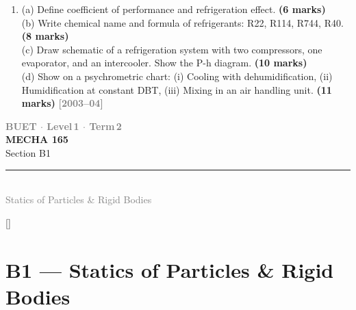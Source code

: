 \documentclass[12pt,a3paper]{article}
\newcommand{\yr}[1]{\hfill\textcolor{gray}{\small\textbf{[#1]}}}
\newcommand{\mk}[1]{\textcolor{orange!70!black}{\small\textbf{(#1 marks)}}}
\newcommand{\secdivider}[4]{%
  \newpage\thispagestyle{empty}%
  \vspace*{\fill}%
  \begin{tcolorbox}[enhanced,colback=#4!7,colframe=#3,boxrule=1.5pt,arc=8pt,
    left=20pt,right=20pt,top=22pt,bottom=22pt,
    shadow={3pt}{-3pt}{0pt}{black!15}]
    \centering
    {\large\textcolor{gray}{\textbf{BUET $\cdot$ Level\,1 $\cdot$ Term\,2}}}\\[8pt]
    {\fontsize{26}{32}\selectfont\bfseries\textcolor{#3}{MECHA 165}}\\[6pt]
    {\fontsize{15}{19}\selectfont\textcolor{dgray}{#1}}\\[12pt]
    \textcolor{#3!60}{\rule{0.5\textwidth}{0.5pt}}\\[6pt]
    {\small\textcolor{gray}{#2}}
  \end{tcolorbox}%
  \vspace*{\fill}\newpage%
}
\begin{document}
\begin{enumerate}
\item \label{qlabel:A3-Q33}
(a) Define coefficient of performance and refrigeration effect. \mk{6}\\
(b) Write chemical name and formula of refrigerants: R22, R114, R744, R40. \mk{8}\\
(c) Draw schematic of a refrigeration system with two compressors, one evaporator, and an intercooler. Show the P-h diagram. \mk{10}\\
(d) Show on a psychrometric chart: (i) Cooling with dehumidification, (ii) Humidification at constant DBT, (iii) Mixing in an air handling unit. \mk{11}
\yr{2003--04}






\end{enumerate}

\secdivider{Section B1}{Statics of Particles \& Rigid Bodies}{cD}{cD}
\label{sec:B1}
\titleformat{\section}{\large\bfseries\color{cD}}{}{0em}{}[\titlerule]
\section{B1 --- Statics of Particles \& Rigid Bodies}
\end{document}
